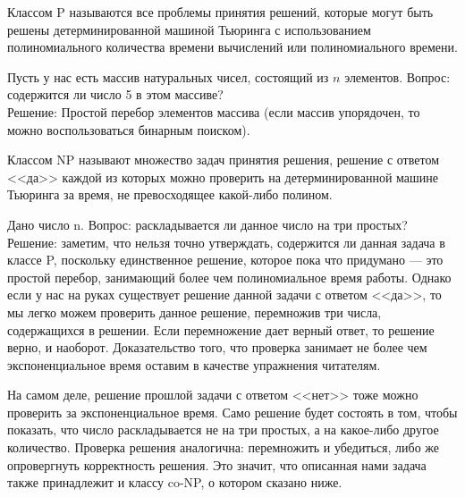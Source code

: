     
    
    \begin{Def} 
        Классом P называются все проблемы принятия решений, которые могут быть решены детерминированной машиной Тьюринга с использованием полиномиального количества времени вычислений или полиномиального времени.
    \end{Def}
    \begin{Example}
        Пусть у нас есть массив натуральных чисел, состоящий из $n$ элементов. Вопрос: содержится ли число 5 в этом массиве?\\
        Решение: Простой перебор элементов массива (если массив упорядочен, то можно воспользоваться бинарным поиском).
    \end{Example}
    \begin{Def}
        Классом NP называют множество задач принятия решения, решение с ответом <<да>> каждой из которых можно проверить на детерминированной машине Тьюринга за время, не превосходящее какой-либо полином.
    \end{Def}
    \begin{Example} 
        Дано число n. Вопрос: раскладывается ли данное число на три простых?\\
        Решение: заметим, что нельзя точно утверждать, содержится ли данная задача в классе P, поскольку единственное решение, которое пока что придумано --- это простой перебор, занимающий более чем полиномиальное время работы. Однако если у нас на руках существует решение данной задачи с ответом <<да>>, то мы легко можем проверить данное решение, перемножив три числа, содержащихся в решении. Если перемножение дает верный ответ, то решение верно, и наоборот. Доказательство того, что проверка занимает не более чем экспоненциальное время оставим в качестве упражнения читателям.
    \end{Example}
    \begin{Rem}
        На самом деле, решение прошлой задачи с ответом <<нет>> тоже можно проверить за экспоненциальное время. Само решение будет состоять в том, чтобы показать, что число раскладывается не на три простых, а на какое-либо другое количество. Проверка решения аналогична: перемножить и убедиться, либо же опровергнуть корректность решения. Это значит, что описанная нами задача также принадлежит и классу co-NP, о котором сказано ниже.
    \end{Rem}
